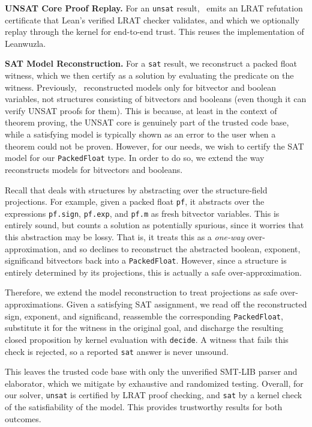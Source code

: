 \noindent\textbf{UNSAT Core Proof Replay.}
For an \texttt{unsat} result, \bvdecide{}~emits an LRAT refutation certificate that Lean's
verified LRAT checker validates, and which we optionally replay through the kernel for end-to-end trust.
This reuses the implementation of Leanwuzla.

\noindent\textbf{SAT Model Reconstruction.}
For a \texttt{sat} result, we reconstruct a packed float witness,
which we then certify as a solution by evaluating the predicate on the witness.
Previously, \bvdecide{}~reconstructed models only for bitvector and boolean variables, not structures consisting
of bitvectors and booleans (even though it can verify UNSAT proofs for them).
This is because, at least in the context of theorem proving, the UNSAT core is genuinely part
of the trusted code base, while a satisfying model is typically shown as an error to the user when a theorem could not be proven.
However, for our needs, we wish to certify the SAT model for our \texttt{PackedFloat} type.
In order to do so, we extend the way \bvdecide{} reconstructs models for bitvectors and booleans.


Recall that \bvdecide{} deals with structures by abstracting over the structure-field projections.
For example, given a packed float \texttt{pf}, it abstracts over the expressions
\texttt{pf.sign}, \texttt{pf.exp}, and \texttt{pf.m} as fresh bitvector variables.
This is entirely sound, but \bvdecide{} counts a solution as potentially spurious,
since it worries that this abstraction may be lossy. That is, it treats this as a \emph{one-way} over-approximation,
and so declines to reconstruct the abstracted boolean, exponent, significand bitvectors back into a \texttt{PackedFloat}.
However, since a structure is entirely determined by its projections, this is actually a safe over-approximation.

Therefore, we extend the model reconstruction to treat projections as safe over-approximations.
Given a satisfying SAT assignment, we read off the reconstructed sign, exponent, and significand,
reassemble the corresponding \texttt{PackedFloat}, substitute it for the witness in the
original goal, and discharge the resulting closed proposition by kernel evaluation with \texttt{decide}.
A witness that fails this check is rejected, so a reported \texttt{sat} answer is never unsound.

This leaves the trusted code base with only the unverified SMT-LIB parser and elaborator,
which we mitigate by exhaustive and randomized testing. Overall, for our solver,
\texttt{unsat} is certified by LRAT proof checking,
and \texttt{sat} by a kernel check of the satisfiability of the model.
This provides trustworthy results for both outcomes.

